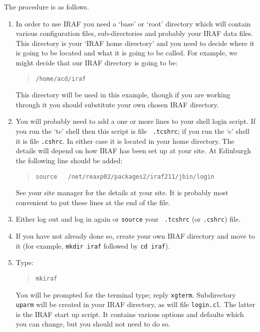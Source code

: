 \documentclass[twoside,11pt]{article}
\begin{document}
The procedure is as follows.

\begin{enumerate}

  \item In order to use IRAF you need a `base' or `root' directory
   which will contain various configuration files, sub-directories
   and probably your IRAF data files.  This directory is your `IRAF
   home directory' and you need to decide where it is going to be located
   and what it is going to be called.  For example, we might decide
   that our IRAF directory is going to be:

  \begin{quote}
   {\tt /home/acd/iraf}
  \end{quote}

   This directory will be used in this example, though if you are
   working through it you should substitute your own chosen IRAF
   directory.

  \item You will probably need to add a one or more lines to your shell
   login script.  If you run the `tc' shell then this script is file {\tt
   .tcshrc}; if you run the `c' shell it is file {\tt .cshrc}.  In either
   case it is located in your home directory.  The details will depend on
   how IRAF has been set up at your site.  At Edinburgh the following line
   should be added:

  \begin{quote}
   {\tt source ~ /net/reaxp02/packages2/iraf211/jbin/login}
  \end{quote}

   See your site manager for the details at your site.  It is probably most
   convenient to put these lines at the end of the file.  
   
  \item Either log out and log in again or {\tt source} your {\tt
   .tcshrc} (or {\tt .cshrc}) file.

  \item If you have not already done so, create your own IRAF directory and
   move to it (for example, {\tt mkdir iraf} followed by {\tt cd iraf}).

  \item Type:

  \begin{quote}
   {\tt mkiraf}
  \end{quote}

   You will be prompted for the terminal type; reply {\tt xgterm}.
   Subdirectory {\tt uparm} will be created in your IRAF directory,
   as will file {\tt login.cl}.  The latter is the IRAF start up script.
   It contains various options and defaults which you can change, but
   you should not need to do so.


\end{enumerate}
\end{document}
